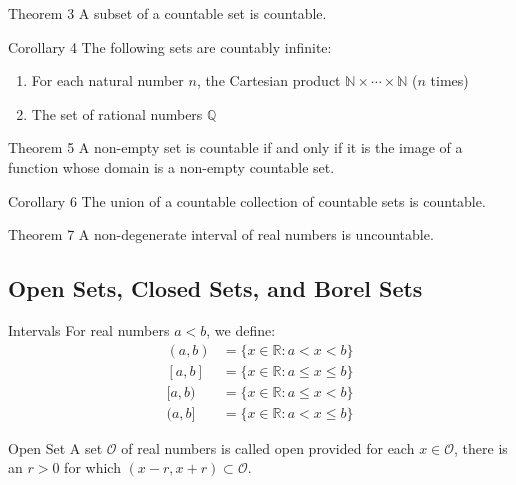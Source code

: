 \begin{theorembox}{Theorem 3}
A subset of a countable set is countable.
\end{theorembox}

\begin{theorembox}{Corollary 4}
The following sets are countably infinite:
\begin{enumerate}[label=(\roman*)]
\item For each natural number $n$, the Cartesian product $\mathbb{N} \times \cdots \times \mathbb{N}$ ($n$ times)
\item The set of rational numbers $\mathbb{Q}$
\end{enumerate}
\end{theorembox}

\begin{theorembox}{Theorem 5}
A non-empty set is countable if and only if it is the image of a function whose domain is a non-empty countable set.
\end{theorembox}

\begin{theorembox}{Corollary 6}
The union of a countable collection of countable sets is countable.
\end{theorembox}

\begin{theorembox}{Theorem 7}
A non-degenerate interval of real numbers is uncountable.
\end{theorembox}

\subsection{Open Sets, Closed Sets, and Borel Sets}

\begin{definitionbox}{Intervals}
For real numbers $a < b$, we define:
\begin{align*}
(a,b) &= \{x \in \mathbb{R} : a < x < b\} \\
[a,b] &= \{x \in \mathbb{R} : a \leq x \leq b\} \\
[a,b) &= \{x \in \mathbb{R} : a \leq x < b\} \\
(a,b] &= \{x \in \mathbb{R} : a < x \leq b\}
\end{align*}
\end{definitionbox}

\begin{definitionbox}{Open Set}
A set $\mathcal{O}$ of real numbers is called open provided for each $x \in \mathcal{O}$, there is an $r > 0$ for which $(x-r, x+r) \subset \mathcal{O}$.
\end{definitionbox}

